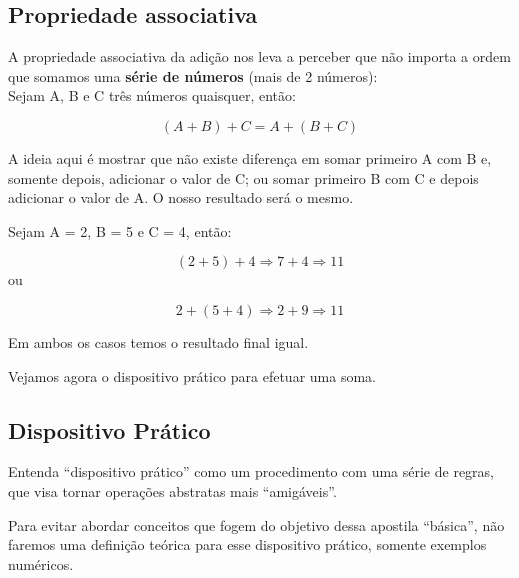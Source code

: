 \subsection{Propriedade associativa}

A propriedade associativa da adição nos leva a perceber que não importa a ordem que somamos uma \textbf{série de números} (mais de 2 números):\\

Sejam A, B e C três números quaisquer, então:

\begin{equation}
    (A+B)+C=A+(B+C)
\end{equation}

A ideia aqui é mostrar que não existe diferença em somar primeiro A com B e, somente depois, adicionar o valor de C; ou somar primeiro B com C e depois adicionar o valor de A. O nosso resultado será o mesmo.

\begin{exemplo}
Sejam A = 2, B = 5 e C = 4, então:

    \begin{equation}
        (2+5)+4 \Rightarrow 7 + 4 \Rightarrow 11
    \end{equation}
ou

    \begin{equation}
        2+(5+4) \Rightarrow 2 + 9 \Rightarrow 11
    \end{equation}

Em ambos os casos temos o resultado final igual.
\end{exemplo}

Vejamos agora o dispositivo prático para efetuar uma soma.

\subsection{Dispositivo Prático}

Entenda ``dispositivo prático'' como um procedimento com uma série de regras, que visa tornar operações abstratas mais ``amigáveis''.

Para evitar abordar conceitos que fogem do objetivo dessa apostila “básica”, não faremos uma definição teórica para esse dispositivo prático, somente exemplos numéricos. 

